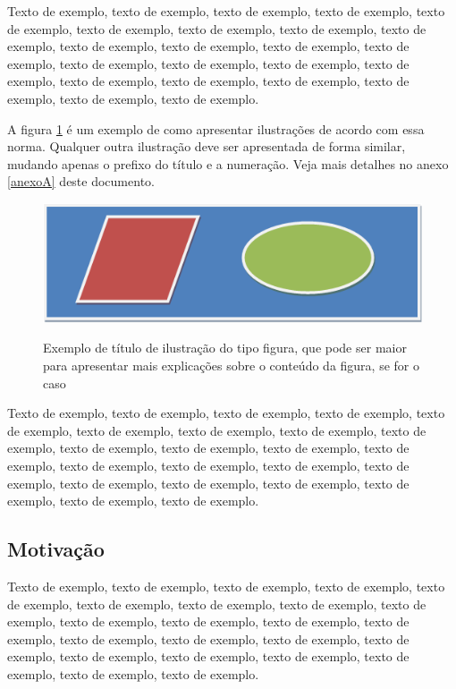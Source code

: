 \documentclass[
	12pt,				%
	oneside,			%
	a4paper,			%
	english,			%
	brazil				%
	]{abntex2ppgsi}
\begin{document}
Texto de exemplo, texto de exemplo, texto de exemplo, texto de exemplo, texto de exemplo, texto de exemplo, texto de exemplo, texto de exemplo, texto de exemplo, texto de exemplo, texto de exemplo, texto de exemplo, texto de exemplo, texto de exemplo, texto de exemplo, texto de exemplo, texto de exemplo, texto de exemplo, texto de exemplo, texto de exemplo, texto de exemplo, texto de exemplo, texto de exemplo.

A figura \ref{fig:figura-exemplo2} é um exemplo de como apresentar ilustrações de acordo com essa norma. Qualquer outra ilustração deve ser apresentada de forma similar, mudando apenas o prefixo do título e a numeração. Veja mais detalhes no anexo \ref{anexoA} deste documento.

\begin{figure}[htbp]
	\centering
  \caption{Exemplo de título de ilustração do tipo figura, que pode ser maior para apresentar mais explicações sobre o conteúdo da figura, se for o caso}
		\includegraphics{figuras/figura-exemplo.png}
	\label{fig:figura-exemplo2}
\end{figure}

Texto de exemplo, texto de exemplo, texto de exemplo, texto de exemplo, texto de exemplo, texto de exemplo, texto de exemplo, texto de exemplo, texto de exemplo, texto de exemplo, texto de exemplo, texto de exemplo, texto de exemplo, texto de exemplo, texto de exemplo, texto de exemplo, texto de exemplo, texto de exemplo, texto de exemplo, texto de exemplo, texto de exemplo, texto de exemplo, texto de exemplo.

\subsection{Motivação}

Texto de exemplo, texto de exemplo, texto de exemplo, texto de exemplo, texto de exemplo, texto de exemplo, texto de exemplo, texto de exemplo, texto de exemplo, texto de exemplo, texto de exemplo, texto de exemplo, texto de exemplo, texto de exemplo, texto de exemplo, texto de exemplo, texto de exemplo, texto de exemplo, texto de exemplo, texto de exemplo, texto de exemplo, texto de exemplo, texto de exemplo.
\end{document}

